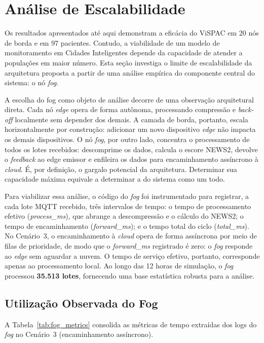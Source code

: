 \documentclass[twoside,english,brazilian]{UNISINOSmonografia}
\begin{document}
\section{Análise de Escalabilidade}
\label{sec:escalabilidade}
Os resultados apresentados até aqui demonstram a eficácia do ViSPAC em 20 nós de borda e em 97 pacientes. Contudo, a viabilidade de um modelo de monitoramento em Cidades Inteligentes depende da capacidade de atender a populações em maior número. Esta seção investiga o limite de escalabilidade da arquitetura proposta a partir de uma análise empírica do componente central do sistema: o nó \textit{fog}.

A escolha do fog como objeto de análise decorre de uma observação arquitetural direta. Cada nó \textit{edge} opera de forma autônoma, processando compressão e \textit{back-off} localmente sem depender dos demais. A camada de borda, portanto, escala horizontalmente por construção: adicionar um novo dispositivo \textit{edge} não impacta os demais dispositivos. O nó \textit{fog}, por outro lado, concentra o processamento de todos os lotes recebidos: descomprime os dados, calcula o escore NEWS2, devolve o \textit{feedback} ao edge emissor e enfileira os dados para encaminhamento assíncrono à \textit{cloud}. É, por definição, o gargalo potencial da arquitetura. Determinar sua capacidade máxima equivale a determinar a do sistema como um todo.

Para viabilizar essa análise, o código do \textit{fog} foi instrumentado para registrar, a cada lote MQTT recebido, três intervalos de tempo: o tempo de processamento efetivo (\textit{process\_ms}), que abrange a descompressão e o cálculo do NEWS2; o tempo de encaminhamento (\textit{forward\_ms}); e o tempo total do ciclo (\textit{total\_ms}). No Cenário~3, o encaminhamento à \textit{cloud} opera de forma assíncrona por meio de filas de prioridade, de modo que o \textit{forward\_ms} registrado é zero: o \textit{fog} responde ao \textit{edge} sem aguardar a nuvem. O tempo de serviço efetivo, portanto, corresponde apenas ao processamento local. Ao longo das 12 horas de simulação, o \textit{fog} processou \textbf{35.513 lotes}, fornecendo uma base estatística robusta para a análise.

\subsection{Utilização Observada do Fog}
A Tabela~\ref{tab:fog_metrics} consolida as métricas de tempo extraídas dos logs do \textit{fog} no Cenário~3 (encaminhamento assíncrono).
\end{document}
